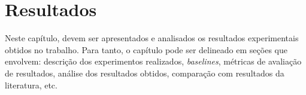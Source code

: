 \chapter{Resultados} \label{resultado}

Neste capítulo, devem ser apresentados e analisados os resultados experimentais obtidos no trabalho. Para tanto, o capítulo pode ser delineado em seções que envolvem: descrição dos experimentos realizados, \textit{baselines}, métricas de avaliação de resultados, análise dos resultados obtidos, comparação com resultados da literatura, etc.


